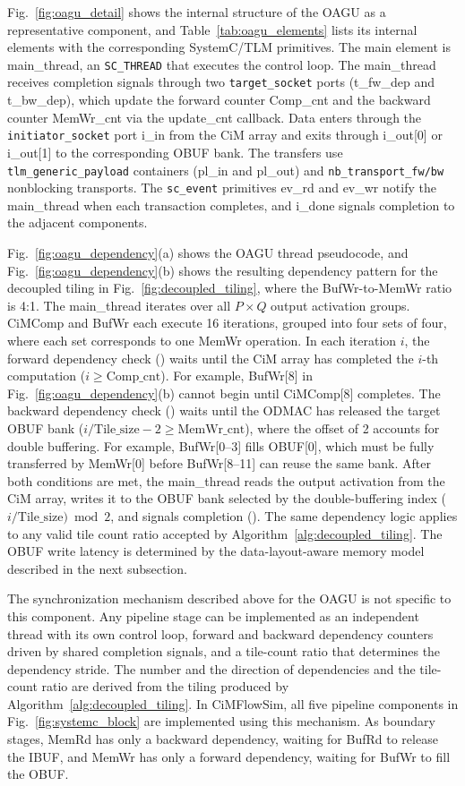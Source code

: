 \documentclass[lettersize,journal]{IEEEtran}
\begin{document}
Fig.~\ref{fig:oagu_detail} shows the internal structure of the OAGU as a representative component, and Table~\ref{tab:oagu_elements} lists its internal elements with the corresponding SystemC/TLM primitives.
The main element is main\_thread, an \texttt{SC\_THREAD} that executes the control loop.
The main\_thread receives completion signals through two \texttt{target\_socket} ports (t\_fw\_dep and t\_bw\_dep), which update the forward counter Comp\_cnt and the backward counter MemWr\_cnt via the update\_cnt callback.
Data enters through the \texttt{initiator\_socket} port i\_in from the CiM array and exits through i\_out[0] or i\_out[1] to the corresponding OBUF bank.
The transfers use \texttt{tlm\_generic\_payload} containers (pl\_in and pl\_out) and \texttt{nb\_transport\_fw/bw} nonblocking transports.
The \texttt{sc\_event} primitives ev\_rd and ev\_wr notify the main\_thread when each transaction completes, and i\_done signals completion to the adjacent components.

Fig.~\ref{fig:oagu_dependency}(a) shows the OAGU thread pseudocode, and Fig.~\ref{fig:oagu_dependency}(b) shows the resulting dependency pattern for the decoupled tiling in Fig.~\ref{fig:decoupled_tiling}, where the BufWr-to-MemWr ratio is 4:1.
The main\_thread iterates over all $P \times Q$ output activation groups.
CiMComp and BufWr each execute 16 iterations, grouped into four sets of four, where each set corresponds to one MemWr operation.
In each iteration $i$, the forward dependency check () waits until the CiM array has completed the $i$-th computation ($i \geq \text{Comp\_cnt}$).
For example, BufWr[8] in Fig.~\ref{fig:oagu_dependency}(b) cannot begin until CiMComp[8] completes.
The backward dependency check () waits until the ODMAC has released the target OBUF bank ($i / \text{Tile\_size} - 2 \geq \text{MemWr\_cnt}$), where the offset of 2 accounts for double buffering.
For example, BufWr[0--3] fills OBUF[0], which must be fully transferred by MemWr[0] before BufWr[8--11] can reuse the same bank.
After both conditions are met, the main\_thread reads the output activation from the CiM array, writes it to the OBUF bank selected by the double-buffering index ($i / \text{Tile\_size}) \bmod 2$, and signals completion ().
The same dependency logic applies to any valid tile count ratio accepted by Algorithm~\ref{alg:decoupled_tiling}.
The OBUF write latency is determined by the data-layout-aware memory model described in the next subsection.

The synchronization mechanism described above for the OAGU is not specific to this component.
Any pipeline stage can be implemented as an independent thread with its own control loop, forward and backward dependency counters driven by shared completion signals, and a tile-count ratio that determines the dependency stride.
The number and the direction of dependencies and the tile-count ratio are derived from the tiling produced by Algorithm~\ref{alg:decoupled_tiling}.
In CiMFlowSim, all five pipeline components in Fig.~\ref{fig:systemc_block} are implemented using this mechanism.
As boundary stages, MemRd has only a backward dependency, waiting for BufRd to release the IBUF, and MemWr has only a forward dependency, waiting for BufWr to fill the OBUF.
\end{document}

